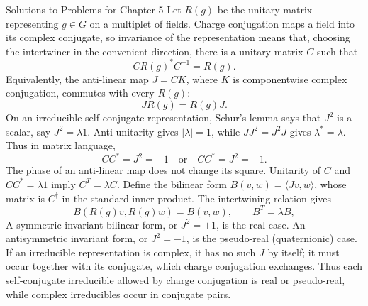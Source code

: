\begin{bankssolutions}{Solutions to Problems for Chapter 5}
Let $R(g)$ be the unitary matrix representing $g\in G$ on a multiplet of fields.
Charge conjugation maps a field into its complex conjugate, so invariance of the
representation means that, choosing the intertwiner in the convenient direction,
there is a unitary matrix $C$ such that
\begin{equation*}
 C R(g)^* C^{-1}=R(g).
\end{equation*}
Equivalently, the anti-linear map $J=CK$, where $K$ is componentwise complex
conjugation, commutes with every $R(g)$:
\begin{equation*}
 J R(g)=R(g)J.
\end{equation*}
On an irreducible self-conjugate representation, Schur's lemma says that
$J^2$ is a scalar, say $J^2=\lambda1$. Anti-unitarity gives $|\lambda|=1$,
while $J J^2=J^2J$ gives $\lambda^*=\lambda$. Thus
in matrix language,
\begin{equation*}
 C C^*=J^2=+1\quad\text{or}\quad C C^*=J^2=-1.
\end{equation*}
The phase of an anti-linear map does not change its square. Unitarity of $C$ and
$CC^*=\lambda1$ imply $C^T=\lambda C$. Define the bilinear form
$B(v,w)=\langle Jv,w\rangle$, whose matrix is $C^\dagger$ in the standard
inner product. The intertwining relation gives
\begin{equation*}
 B(R(g)v,R(g)w)=B(v,w),
 \qquad B^T=\lambda B,
\end{equation*}
A symmetric invariant bilinear form, or $J^2=+1$, is the real case. An
antisymmetric invariant form, or $J^2=-1$, is the pseudo-real (quaternionic)
case. If an irreducible representation is complex, it has no such $J$ by itself;
it must occur together with its conjugate, which charge conjugation exchanges.
Thus each self-conjugate irreducible allowed by charge conjugation is real or
pseudo-real, while complex irreducibles occur in conjugate pairs.

\end{bankssolutions}
